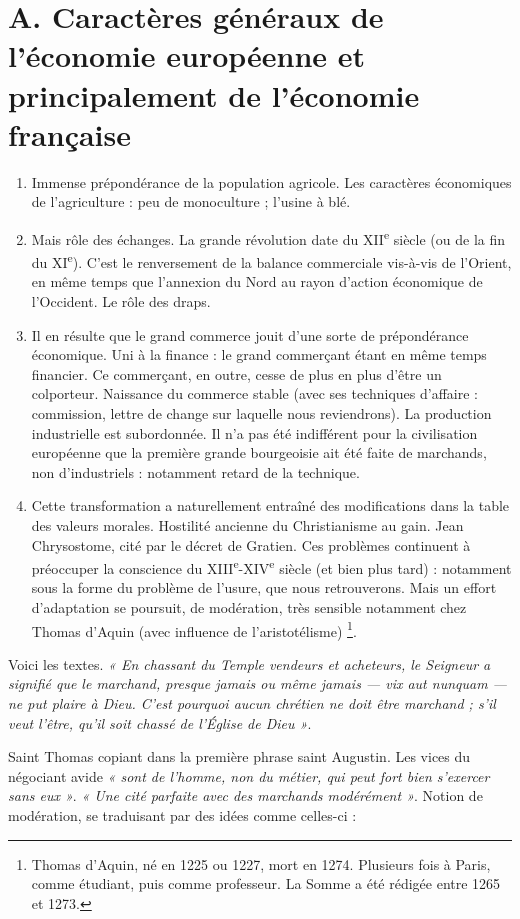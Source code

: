 \documentclass[french,twoside]{book} %
\begin{document}
\section[A. Caractères généraux de l’économie européenne et principalement de l’économie française]{A. Caractères généraux de l’économie européenne et principalement de l’économie française}
\label{c09a}
\label{p83}
\begin{enumerate}[itemsep=0pt,]
\item Immense prépondérance de la population agricole. Les caractères économiques de l’agriculture : peu de monoculture ; l’usine à blé.
\item Mais rôle des échanges. La grande révolution date du XII\textsuperscript{e} siècle (ou de la fin du XI\textsuperscript{e}). C’est le renversement de la balance commerciale vis-à-vis de l’Orient, en même temps que l’annexion du Nord au rayon d’action économique de l’Occident. Le rôle des draps.
\item Il en résulte que le grand commerce jouit d’une sorte de prépondérance économique. Uni à la finance : le grand commerçant étant en même temps financier. Ce commerçant, en outre, cesse de plus en plus d’être un colporteur. Naissance du commerce stable (avec ses techniques d’affaire : commission, lettre de change sur laquelle nous reviendrons). La production industrielle est subordonnée. Il n’a pas été indifférent pour la civilisation européenne que la première grande bourgeoisie ait été faite de marchands, non d’industriels : notamment retard de la technique.
\item Cette transformation a naturellement entraîné des modifications dans la table des valeurs morales. Hostilité ancienne du Christianisme au gain. Jean Chrysostome, cité par le décret de Gratien.  
\label{p84} Ces problèmes continuent à préoccuper la conscience du XIII\textsuperscript{e}-XIV\textsuperscript{e} siècle (et bien plus tard) : notamment sous la forme du problème de l’usure, que nous retrouverons. Mais un effort d’adaptation se poursuit, de modération, très sensible notamment chez Thomas d’Aquin (avec influence de l’aristotélisme) \footnote{Thomas d’Aquin, né en 1225 ou 1227, mort en 1274. Plusieurs fois à Paris, comme étudiant, puis comme professeur. La Somme a été rédigée entre 1265 et 1273.}.

\end{enumerate}\noindent Voici les textes. \emph{« En chassant du Temple vendeurs et acheteurs, le Seigneur a signifié que le marchand, presque jamais ou même jamais — {\itshape vix aut nunquam —} ne put plaire à Dieu. C’est pourquoi aucun chrétien ne doit être marchand ; s’il veut l’être, qu’il soit chassé de l’Église de Dieu »}.\par
Saint Thomas copiant dans la première phrase saint Augustin. Les vices du négociant avide \emph{« sont de l’homme, non du métier, qui peut fort bien s’exercer sans eux »}. \emph{« Une cité parfaite avec des marchands modérément »}. Notion de modération, se traduisant par des idées comme celles-ci :\par
\end{document}
